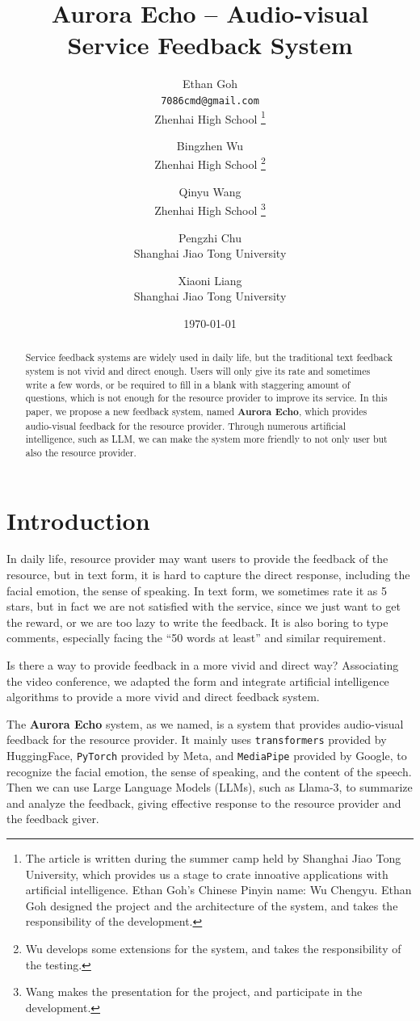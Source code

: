\documentclass{article}
\title{Aurora Echo -- Audio-visual Service Feedback System}
\author{
    Ethan Goh \\ \texttt{7086cmd@gmail.com} \\ Zhenhai High School
        \thanks{The article is written during the summer camp held by Shanghai Jiao Tong University, which provides us a stage to crate innoative applications with artificial intelligence. Ethan Goh's Chinese Pinyin name: Wu Chengyu. Ethan Goh designed the project and the architecture of the system, and takes the responsibility of the development.}
    \and Bingzhen Wu \\ Zhenhai High School \thanks{Wu develops some extensions for the system, and takes the responsibility of the testing.}
    \and Qinyu Wang \\ Zhenhai High School \thanks{Wang makes the presentation for the project, and participate in the development.}
    \and Pengzhi Chu \\ Shanghai Jiao Tong University
    \and Xiaoni Liang \\ Shanghai Jiao Tong University
}
\date{\today}
\begin{document}
    \maketitle

    \begin{abstract}
        Service feedback systems are widely used in daily life, but the traditional text feedback system is not vivid and direct enough.
        Users will only give its rate and sometimes write a few words, or be required to fill in a blank with staggering amount of questions, which is not enough for the resource provider to improve its service.
        In this paper, we propose a new feedback system, named \textbf{Aurora Echo}, which provides audio-visual feedback for the resource provider.
        Through numerous artificial intelligence, such as LLM, we can make the system more friendly to not only user but also the resource provider.
    \end{abstract}

    \newpage

    \section{Introduction}\label{sec:intro}

    In daily life, resource provider may want users to provide the feedback of the resource\cite{åström2010feedback}, but in text form, it is hard to capture the direct response, including the facial emotion, the sense of speaking.
    In text form, we sometimes rate it as 5 stars, but in fact we are not satisfied with the service, since we just want to get the reward, or we are too lazy to write the feedback.
    It is also boring to type comments, especially facing the ``50 words at least'' and similar requirement.

    Is there a way to provide feedback in a more vivid and direct way?
    Associating the video conference, we adapted the form and integrate artificial intelligence algorithms to provide a more vivid and direct feedback system.

    The \textbf{Aurora Echo} system, as we named, is a system that provides audio-visual feedback for the resource provider.
    It mainly uses \texttt{transformers}\cite{DBLP:journals/corr/abs-1910-03771} provided by HuggingFace, \texttt{PyTorch}\cite{DBLP:journals/corr/abs-1912-01703} provided by Meta, and \texttt{MediaPipe}\cite{DBLP:journals/corr/abs-1906-08172} provided by Google, to recognize the facial emotion, the sense of speaking, and the content of the speech.
    Then we can use Large Language Models (LLMs), such as Llama-3, to summarize and analyze the feedback, giving effective response to the resource provider and the feedback giver.
\end{document}

